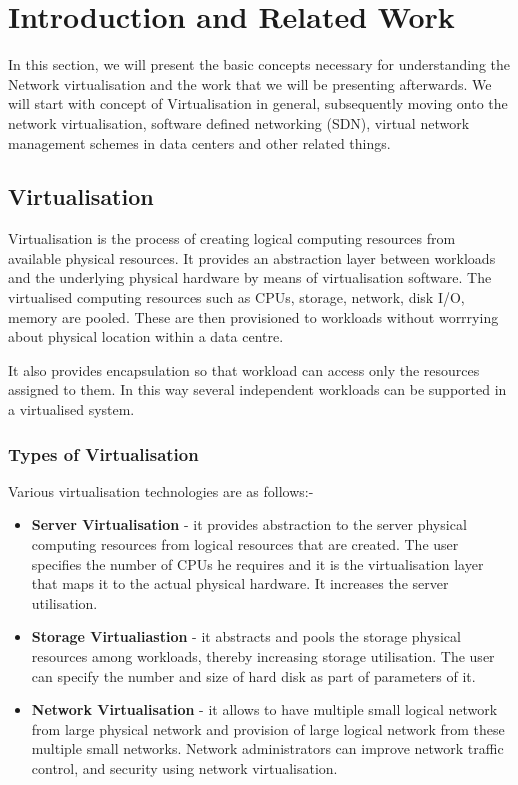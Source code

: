 \chapter{Introduction and Related Work}


In this section, we will present the basic concepts necessary for understanding the Network virtualisation and the work that we will be presenting afterwards. We will start with concept of Virtualisation in general, subsequently moving onto the network virtualisation, software defined networking (SDN), virtual network management schemes in data centers and other related things.

\section{Virtualisation}
Virtualisation is the process of creating logical computing resources from available physical resources. It provides an abstraction layer between workloads and the underlying physical hardware by means of virtualisation software. The virtualised computing resources such as CPUs, storage, network, disk I/O, memory are pooled. These are then provisioned to workloads without worrrying about physical location within a data centre.

It also provides encapsulation so that workload can access only the resources assigned to them. In this way several independent workloads can be supported in a virtualised system.

\subsection{Types of Virtualisation}
Various virtualisation technologies are as follows:-

\begin{itemize}
    \item \textbf{Server Virtualisation} - it provides abstraction to the server physical computing resources from logical resources that are created. The user specifies the number of CPUs he requires and it is the virtualisation layer that maps it to the actual physical hardware. It increases the server utilisation.
    \item \textbf{Storage Virtualiastion} - it abstracts and pools the storage physical resources among workloads, thereby increasing storage utilisation. The user can specify the number and size of hard disk as part of parameters of it.
    \item \textbf{Network Virtualisation} - it allows to have multiple small logical network from large physical network and provision of large logical network from these multiple small networks. Network administrators can improve network traffic control, and security using network virtualisation.
\end{itemize}

